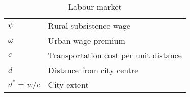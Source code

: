\begin{longtable}{lp{10cm}}
\caption{Labour market}                                                            \\
\hline
$\psi$            &  Rural subsistence wage                             \\  
$\omega$          &  Urban wage premium          \\
${c}$             &  Transportation cost per unit distance \\ %
$d$               &  Distance from city centre   \\
$d^* = w/{c}$     &  City extent \\ %

\hline
\end{longtable}

